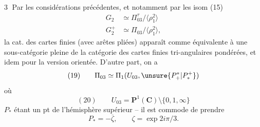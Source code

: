 \textcircled{3} Par les considérations précédentes, et notamment par les isom (15)
\[
\begin{split}
G_2&\simeq\Pi_{03}^{\tau}/\langle\rho_1^2\rangle\\
G_2^+&\simeq\Pi_{03}/\langle\rho_1^2\rangle,
\end{split}
\]
la cat.  des cartes finies (avec arêtes pliées) apparaît comme équivalente à une sous-catégorie pleine de la catégorie  des cartes finies tri-angulaires pondérées, et idem pour la version orientée. D'autre part, on a
\[
(19)\qquad\Pi_{03}\simeq\Pi_1(U_{03},\unsure{P_+^*|P_*^+})
\]
où 
\[
(20)\qquad U_{03}=\mathbf P^1(\mathbf C)\setminus\{0,1,\infty\}
\]
 $P_*$ étant un pt  de l'hémisphère supérieur -- il est commode de prendre
\[
P_*=-\overline\zeta,\qquad\zeta=\exp 2i\pi/3.
\]

